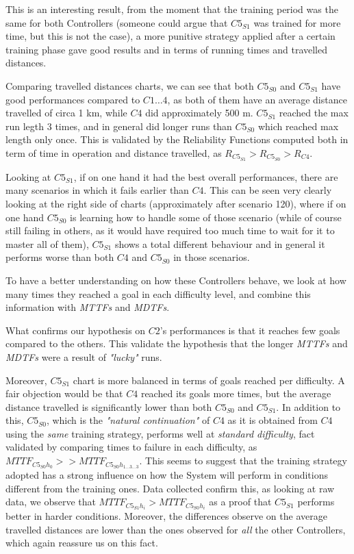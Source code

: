 This is an interesting result, from the moment that the training period was the same for both Controllers (someone could argue that $C5_{S1}$ was trained for more time, but this is not the case), a more punitive strategy applied after a certain training phase gave good results and in terms of running times and travelled distances.
\newline

Comparing travelled distances charts, we can see that both $C5_{S0}$ and $C5_{S1}$ have good performances compared to $C1\dots 4$, as both of them have an average distance travelled of circa 1 km, while $C4$ did approximately 500 m. $C5_{S1}$ reached the max run legth 3 times, and in general did longer runs than $C5_{S0}$ which reached max length only once.
This is validated by the Reliability Functions computed both in term of time in operation and distance travelled, as $R_{C5_{S1}} > R_{C5_{S0}} > R_{C4}$.

Looking at $C5_{S1}$, if on one hand it had the best overall performances, there are many scenarios in which it fails earlier than $C4$. This can be seen very clearly looking at the right side of charts (approximately after scenario 120), where if on one hand $C5_{S0}$ is learning how to handle some of those scenario (while of course still failing in others, as it would have required too much time to wait for it to master all of them), $C5_{S1}$ shows a total different behaviour and in general it performs worse than both $C4$ and $C5_{S0}$ in those scenarios.


To have a better understanding on how these Controllers behave, we look at how many times they reached a goal in each difficulty level, and combine this information with \textsl{MTTFs} and \textsl{MDTFs}.

What confirms our hypothesis on $C2$'s performances is that it reaches few goals compared to the others. This validate the hypothesis that the longer \textsl{MTTFs} and \textsl{MDTFs} were a result of \textsl{"lucky"} runs.

Moreover, $C5_{S1}$ chart is more balanced in terms of goals reached per difficulty. A fair objection would be that $C4$ reached its goals more times, but the average distance travelled is significantly lower than both $C5_{S0}$ and $C5_{S1}$. In addition to this, $C5_{S0}$, which is the \textsl{"natural continuation"} of $C4$ as it is obtained from $C4$ using the \textsl{same} training strategy, performs well at \textsl{standard difficulty}, fact validated by comparing times to failure in each difficulty, as $MTTF_{C5_{S0}h_{0}} >> MTTF_{C5_{S0}h_{1\dots 3\dots 3}}$.
This seems to suggest that the training strategy adopted has a strong influence on how the System will perform in conditions different from the training ones. Data collected confirm this, as looking at raw data, we observe that $MTTF_{C5_{S1}h_{i}} > MTTF_{C5_{S0}h_{i}}$ as a proof that $C5_{S1}$ performs better in harder conditions. Moreover, the differences observe on the average travelled distances are lower than the ones observed for \textsl{all} the other Controllers, which again reassure us on this fact.

